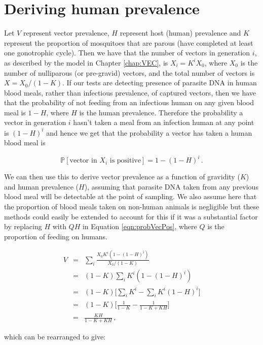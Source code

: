 \section[Human prevalence]{Deriving human prevalence}

Let $V$ represent vector prevalence, $H$ represent host (human) prevalence and $K$ represent the proportion of mosquitoes that are parous (have completed at least one gonotrophic cycle). Then we have that the number of vectors in generation $i$, as described by the model in Chapter \ref{chap:VEC}, is $X_i = K^iX_0$, where $X_0$ is the number of nulliparous (or pre-gravid) vectors, and the total number of vectors is $X = X_0/(1-K)$. If our tests are detecting presence of parasite DNA in human blood meals, rather than infectious prevalence, of captured vectors, then we have that the probability of not feeding from an infectious human on any given blood meal is $1-H$, where $H$ is the human prevalence. Therefore the probability a vector in generation $i$ hasn't taken a meal from an infection human at any point is $(1-H)^i$ and hence we get that the probability a vector has taken a human blood meal is

\begin{equation}
    \mathbb{P}[\mbox{vector in } X_i \mbox{ is positive}] = 1-(1-H)^i\,.
    \label{eqn:probVecPos}
\end{equation}

We can then use this to derive vector prevalence as a function of gravidity ($K$) and human prevalence ($H$), assuming that parasite DNA taken from any previous blood meal will be detectable at the point of sampling. We also assume here that the proportion of blood meals taken on non-human animals is negligible but these methods could easily be extended to account for this if it was a substantial factor by replacing $H$ with $QH$ in Equation \ref{eqn:probVecPos}, where $Q$ is the proportion of feeding on humans.

\begin{eqnarray}
V &=& \sum_{i}\frac{X_0K^i(1-(1-H)^i)}{X_0/(1-K)}\\
&=& (1-K)\sum_{i}K^i(1-(1-H)^i)\\
&=& (1-K)\Big[\sum_{i}K^i - \sum_{i}K^i(1-H)^i \Big]\\
&=& (1-K)\Bigg[\frac{1}{1-K} - \frac{1}{1-K+KH}\Bigg]\\
&=& \frac{KH}{1-K+KH}\,,
\end{eqnarray}

which can be rearranged to give:

